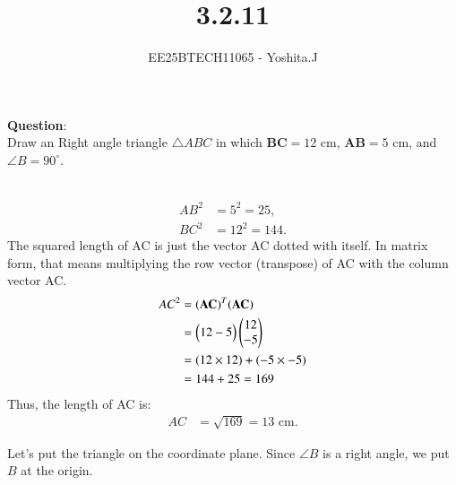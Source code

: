 \documentclass[journal]{IEEEtran}
\begin{document}

\vspace{3cm}

\title{3.2.11}
\author{EE25BTECH11065 - Yoshita.J}
{\let\newpage\relax\maketitle}

\renewcommand{\thefigure}{\theenumi}
\renewcommand{\thetable}{\theenumi}
\setlength{\intextsep}{10pt} %


\renewcommand{\thetable}{\theenumi}


\textbf{Question}:\\
Draw an Right angle  triangle $\triangle ABC$ in which $\boldsymbol{BC} = 12 \text{ cm}$, $\boldsymbol{AB} = 5 \text{ cm}$, and $\angle B = 90^\circ$.
\\ \solution \\
    \begin{table}[h!]    
      \centering
      
      \caption{}
    \end{table}
   \begin{align*}
      AB^2 & = 5^2 = 25, \\
      BC^2 & = 12^2 = 144.
   \end{align*}
   The squared length of AC is just the vector AC dotted with itself. In matrix form, that means multiplying the row vector (transpose) of AC with the column vector AC.
   \begin{align*}
    AC^2 &= (\mathbf{AC})^T (\mathbf{AC}) \\
         &= \begin{pmatrix}12 -5\end{pmatrix} \begin{pmatrix}12 \\ -5\end{pmatrix} \\
         &= (12 \times 12) + (-5 \times -5) \\
         &= 144 + 25 = 169
\end{align*}
Thus, the length of AC is:
\begin{align*}
    AC &= \sqrt{169} = 13 \text{ cm}.
\end{align*}
\newpage{}

Let's put the triangle on the coordinate plane.  
Since $\angle B$ is a right angle, we put $B$ at the origin.  \\
\end{document}

